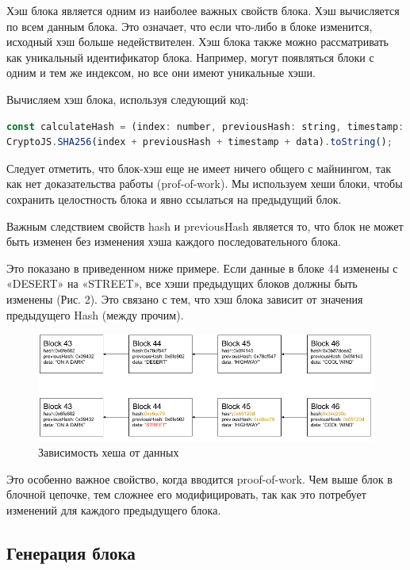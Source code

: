 \documentclass{article}
\begin{document}
Хэш блока является одним из наиболее важных свойств блока. Хэш вычисляется по всем данным блока. Это означает, что если что-либо в блоке изменится, исходный хэш больше недействителен. Хэш блока также можно рассматривать как уникальный идентификатор блока. Например, могут появляться блоки с одним и тем же индексом, но все они имеют уникальные хэши.

Вычисляем хэш блока, используя следующий код:

\begin{lstlisting}[language=JavaScript, caption={Вычисление хэша блока}]
const calculateHash = (index: number, previousHash: string, timestamp: number, data: string): string =>
CryptoJS.SHA256(index + previousHash + timestamp + data).toString();
\end{lstlisting}

Следует отметить, что блок-хэш еще не имеет ничего общего с майнингом, так как нет доказательства работы (prof-of-work). Мы используем хеши блоки, чтобы сохранить целостность блока и явно ссылаться на предыдущий блок.

Важным следствием свойств hash и previousHash является то, что блок не может быть изменен без изменения хэша каждого последовательного блока.

Это показано в приведенном ниже примере. Если данные в блоке 44 изменены с «DESERT» на «STREET», все хэши предыдущих блоков должны быть изменены (Рис. 2). Это связано с тем, что хэш блока зависит от значения предыдущего Hash (между прочим).

\begin{figure}
	\centering
	\includegraphics[scale=0.45]{previous_hash_chain}
	\caption{Зависимость хеша от данных}
	\label{fig:previous_hash_chain}
\end{figure}

Это особенно важное свойство, когда вводится proof-of-work. Чем выше блок в блочной цепочке, тем сложнее его модифицировать, так как это потребует изменений для каждого предыдущего блока.


\subsection{Генерация блока}
\end{document}
